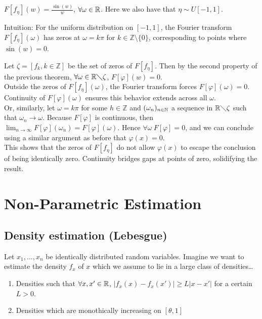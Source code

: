 \documentclass{article}
\begin{document}
\begin{example}
    \(F[f_{\eta}](w)=\frac{\sin(w)}{w}\), \(\forall \omega \in \mathbb{R}\). Here we also have that \(\eta \sim U[-1,1]\). 
    
    Intuition: For the uniform distribution on \([-1, 1]\), the Fourier transform \(F[f_\eta](\omega)\) has zeros at \(\omega = k\pi\) for \(k \in \mathbb{Z} \setminus \{0\}\), corresponding to points where \(\sin(w) = 0\).

    Let \(\zeta=\left[f_{k}, k\in \mathbb{Z}\right]\) be the set of zeros of \(F[f_{\eta}]\). Then by the second property of the previous theorem, \(\forall \omega \in \mathbb{R} \diagdown \zeta\), \(F[\varphi](w)=0\). \\ 
    
    Outside the zeros of \(F[f_\eta](\omega)\), the Fourier transform forces \(F[\varphi](\omega) = 0\). Continuity of \(F[\varphi](\omega)\) ensures this behavior extends across all \(\omega\). \\

    Or, similarly, let \(\omega=k\pi\) for some \(h \in \mathbb{Z}\) and \((\omega_{n})_{n \in \mathbb{N}}\) a sequence in \(\mathbb{R} \diagdown \zeta\) such that \(\omega_n \rightarrow \omega\). Because \(F[\varphi]\) is continuous, then \(\lim_{n\rightarrow \infty}F[\varphi](\omega_n)=F[\varphi](\omega)\). Hence \(\forall \omega \ F[\varphi]=0\), and we can conclude using a similar argument as before that \(\varphi(x)=0\). \\

    This shows that the zeros of \(F[f_\eta]\) do not allow \(\varphi(x)\) to escape the conclusion of being identically zero. Continuity bridges gaps at points of zero, solidifying the result.
\end{example}


\section{Non-Parametric Estimation}

\subsection{Density estimation (Lebesgue)}
Let \(x_{1},...,x_{n}\) be identically distributed random variables. Imagine we want to estimate the density \(f_x\) of \(x\) which we assume to lie in a large class of densities\dots

\begin{example}

    \begin{enumerate} We have two examples: \\
        \item Densities such that \(\forall x, x'\in \mathbb{R}\), \(|f_{x}(x)-f_{x}(x')| \geq L|x-x'|\) for a certain \(L>0\). 
        \item Densities which are monothically increasing on \([\theta,1]\)
    \end{enumerate}

\end{example}
\end{document}
